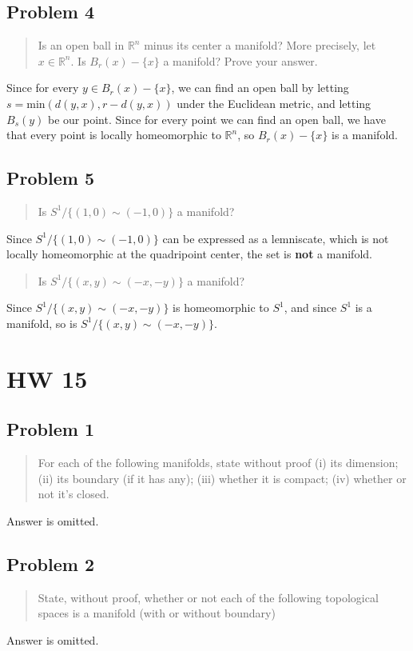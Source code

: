\documentclass[8pt]{extarticle}
\newcommand{\plain}[1]{\textrm{#1}}
\begin{document}
{\subsection*{Problem 4}%
\begin{quote}
	Is an open ball in $\mathbb{R}^n$ minus its center a manifold? More precisely, let $x\in \mathbb{R}^n$. Is $B_{r}(x)-\{x\}$ a manifold? Prove your answer.
\end{quote}
Since for every $y\in B_{r}(x)-\{x\}$, we can find an open ball by letting $s = \plain{min}(d(y,x),r-d(y,x))$ under the Euclidean metric, and letting $B_{s}(y)$ be our point. Since for every point we can find an open ball, we have that every point is locally homeomorphic to $\mathbb{R}^n$, so $B_{r}(x)-\{x\}$ is a manifold.
\subsection*{Problem 5}%
\begin{quote}
	Is $S^1/\{(1,0)\sim (-1,0)\}$ a manifold?
\end{quote}
Since $S^1/\{(1,0)\sim (-1,0)\}$ can be expressed as a lemniscate, which is not locally homeomorphic at the quadripoint center, the set is \textbf{not} a manifold.
\begin{quote}
	Is $S^1/\{(x,y)\sim (-x,-y)\}$ a manifold?
\end{quote}
Since $S^1/\{(x,y)\sim (-x,-y)\}$ is homeomorphic to $S^1$, and since $S^1$ is a manifold, so is $S^1/\{(x,y)\sim (-x,-y)\}$.
\pagebreak
\section*{HW 15}%
\subsection*{Problem 1}%
\begin{quote}
	For each of the following manifolds, state without proof (i) its dimension; (ii) its boundary (if it has any); (iii) whether it is compact; (iv) whether or not it's closed.
\end{quote}
Answer is omitted.
\subsection*{Problem 2}%

\begin{quote}
	State, without proof, whether or not each of the following topological spaces is a manifold (with or without boundary)
\end{quote}
Answer is omitted.
}
\end{document}
